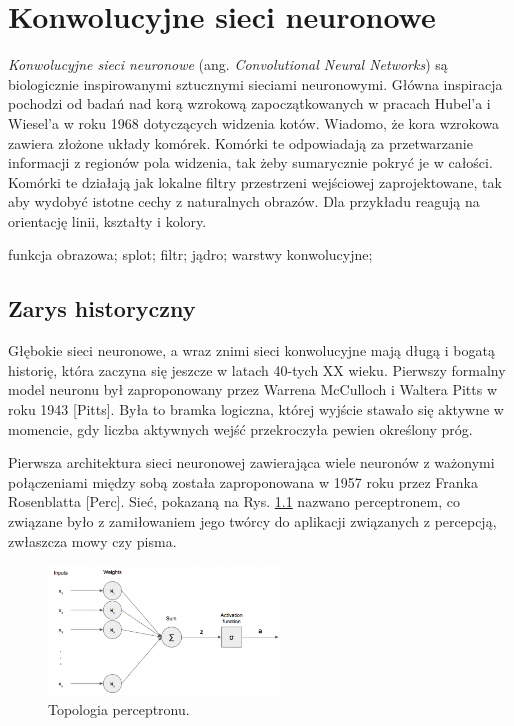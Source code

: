 \chapter{Konwolucyjne sieci neuronowe}
\textit{Konwolucyjne sieci neuronowe} (ang. \textit{Convolutional Neural Networks}) są biologicznie inspirowanymi sztucznymi sieciami neuronowymi. Główna inspiracja pochodzi od badań nad korą wzrokową zapoczątkowanych w pracach Hubel'a i Wiesel’a w roku 1968 dotyczących widzenia kotów. Wiadomo, że kora wzrokowa zawiera złożone układy komórek. Komórki te odpowiadają za przetwarzanie informacji z regionów pola widzenia, tak żeby sumarycznie pokryć je w całości. Komórki te działają jak lokalne filtry przestrzeni wejściowej zaprojektowane, tak aby wydobyć istotne cechy z naturalnych obrazów. Dla przykładu reagują na orientację linii, kształty i kolory.

funkcja obrazowa;
splot;
filtr;
jądro;
warstwy konwolucyjne;

\section{Zarys historyczny}

Głębokie sieci neuronowe, a wraz znimi sieci konwolucyjne mają długą i bogatą historię, która zaczyna się jeszcze w latach 40-tych XX wieku. Pierwszy formalny model neuronu był zaproponowany przez Warrena McCulloch i Waltera Pitts w roku 1943 [Pitts]. Była to bramka logiczna, której wyjście stawało się aktywne w momencie, gdy liczba aktywnych wejść przekroczyła pewien określony próg. 

Pierwsza architektura sieci neuronowej zawierająca wiele neuronów z ważonymi połączeniami między sobą została zaproponowana w 1957 roku przez Franka Rosenblatta [Perc]. Sieć, pokazaną na Rys. \ref{Perceptron} nazwano perceptronem, co związane było z zamiłowaniem jego twórcy do aplikacji związanych z percepcją, zwłaszcza mowy czy pisma. 
\begin{figure}[h!]
	\centering
	\includegraphics[width=0.55\textwidth]{figures/perceptron.png}
	\caption{Topologia perceptronu.}
	\label{Perceptron}
\end{figure}

